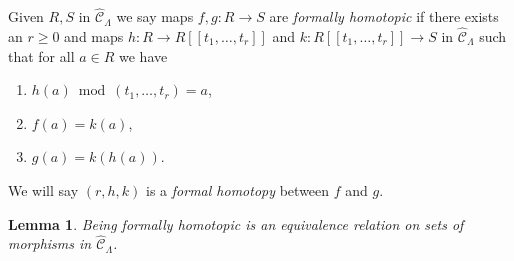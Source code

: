 \documentclass{stacks-project}
\theoremstyle{plain}
\newtheorem{lemma}[subsection]{Lemma}
\theoremstyle{definition}
\theoremstyle{remark}
\numberwithin{equation}{subsection}
\begin{document}
\noindent
Given $R, S$ in $\widehat{\mathcal{C}}_\Lambda$ we say maps
$f, g : R \to S$ are {\it formally homotopic} if there exists an
$r \geq 0$ and maps $h : R \to R[[t_1, \ldots, t_r]]$ and
$k : R[[t_1, \ldots, t_r]] \to S$ in $\widehat{\mathcal{C}}_\Lambda$
such that for all $a \in R$ we have
\begin{enumerate}
\item $h(a) \bmod (t_1, \ldots, t_r) = a$,
\item $f(a) = k(a)$,
\item $g(a) = k(h(a))$.
\end{enumerate}
We will say $(r, h, k)$ is a {\it formal homotopy} between $f$ and $g$.

\begin{lemma}
\label{lemma-homotopy}
Being formally homotopic is an equivalence relation on
sets of morphisms in $\widehat{\mathcal{C}}_\Lambda$.
\end{lemma}
\end{document}
